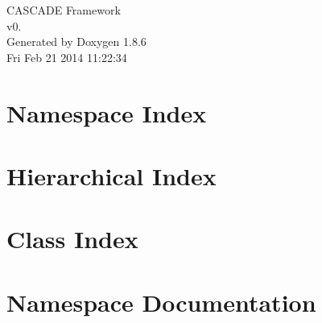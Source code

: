 \documentclass[twoside]{book}
\newcommand{\clearemptydoublepage}{%
  \newpage{\pagestyle{empty}\cleardoublepage}%
}
\begin{document}
\hypersetup{pageanchor=false}
\begin{titlepage}
\vspace*{7cm}
\begin{center}%
{\Large C\-A\-S\-C\-A\-D\-E Framework \\[1ex]\large v0. }\\
\vspace*{1cm}
{\large Generated by Doxygen 1.8.6}\\
\vspace*{0.5cm}
{\small Fri Feb 21 2014 11:22:34}\\
\end{center}
\end{titlepage}
\clearemptydoublepage
\tableofcontents
\clearemptydoublepage
{}
\hypersetup{pageanchor=true}

\chapter{Namespace Index}

\chapter{Hierarchical Index}

\chapter{Class Index}

\chapter{Namespace Documentation}




















\end{document}
